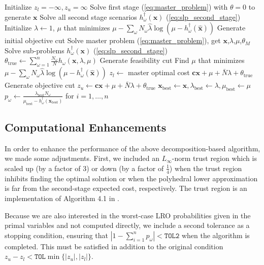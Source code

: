 \documentclass[11pt]{article}
\newcommand{\x}{\mathbf{x}}
\newcommand{\xh}{\hat{\x}}
\newcommand{\lh}{\hat{\lambda}}
\renewcommand{\c}{\mathbf{c}}
\begin{document}
\begin{algorithmic}
	\State Initialize $z_l = -\infty, z_u = \infty$
	\State Solve first stage (\ref{eq:master_problem}) with $\theta = 0$  to generate $\x$
	\State Solve all second stage scenarios $h^\dagger_\omega(\x)$ (\ref{eq:slp_second_stage})
	\State Initialize $\lambda \gets 1$, $\mu$ that minimizes $\mu - \sum_\omega N_\omega \lh \log(\mu - h^\dagger_\omega(\xh))$
	\State Generate initial objective cut
		\State Solve master problem (\ref{eq:master_problem}), get $\x$,$\lambda$,$\mu$,$\theta_M$
		\State Solve sub-problems $h^\dagger_\omega(\x)$ (\ref{eq:slp_second_stage})
		\State $\theta_{\text{true}} \gets \sum_{\omega=1}^n \frac{N_\omega}{N} h_\omega(\x,\lambda,\mu)$
		\If{$\mu < \max_\omega h^\dagger_\omega(\x)$}
			\State Generate feasibility cut
			\State Find $\mu$ that minimizes $\mu - \sum_\omega N_\omega \lh \log(\mu - h^\dagger_\omega(\xh))$
		\Else
			\State $z_l \gets$ master optimal cost $\c\x + \mu + \bar{N}\lambda + \theta_{\text{true}}$
		\EndIf
		\State Generate objective cut
		\If{$\c\x + \mu + \bar{N}\lambda + \theta_{\text{true}} < z_u$}
			\State $z_u \gets \c\x + \mu + \bar{N}\lambda + \theta_{\text{true}}$
			\State $\x_\text{best} \gets \x, \lambda_\text{best} \gets \lambda, \mu_\text{best} \gets \mu$
			\State $p_\omega \gets \frac{\lambda_\text{best} N_\omega}{\mu_\text{best} - h^\dagger_\omega(\x_\text{best})}$ for $i = 1, \dots, n$
		\EndIf
	\EndWhile
\end{algorithmic}

\subsection{Computational Enhancements}

In order to enhance the performance of the above decomposition-based algorithm, we made some adjustments.
First, we included an $L_\infty$-norm trust region which is scaled up (by a factor of $3$) or down (by a factor of $\tfrac{1}{4}$) when the trust region inhibits finding the optimal solution or when the polyhedral lower approximation is far from the second-stage expected cost, respectively.
The trust region is an implementation of Algorithm 4.1 in \cite{nocedal1999numerical}.

Because we are also interested in the worst-case LRO probabilities given in the primal variables and not computed directly, we include a second tolerance as a stopping condition, ensuring that $\left| 1 - \sum_{i=1}^n p_\omega \right| < \texttt{TOL2}$ when the algorithm is completed.
This must be satisfied in addition to the original condition $z_u - z_l < \texttt{TOL}\min\{|z_u|,|z_l|\}$.
\end{document}
